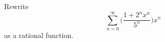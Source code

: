   Rewrite
  \[
    \sum_{n=0}^\infty \biggl( \frac{1 + 2^nx^n}{5^n} \biggr) x^n 
  \]
  as a rational function.
